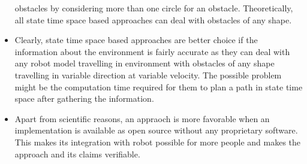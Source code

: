 \begin{itemize}
        obstacles by considering more than one circle for an obstacle\cite{large2005navigation}. 
        Theoretically, all state time space based approaches can deal with obstacles of any shape.
    \item Clearly, state time space based approaches are better choice if the information about the 
        environment is fairly accurate as they can deal with any robot model travelling in environment 
        with obstacles of any shape travelling in variable direction at variable velocity. The 
        possible problem might be the computation time required for them to plan a path in state 
        time space after gathering the information.
    \item Apart from scientific reasons, an appraoch is more favorable when an implementation is 
        available as open source without any proprietary software. This makes its integration with
        robot possible for more people and makes the approach and its claims verifiable.
\end{itemize}

